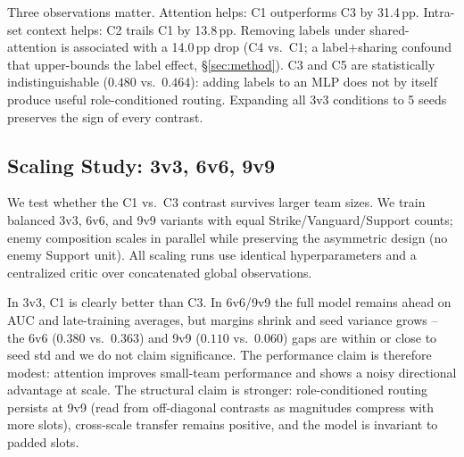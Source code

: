 \documentclass{nextgame2026}
\begin{document}
Three observations matter. Attention helps: C1 outperforms C3 by 31.4\,pp. Intra-set context helps: C2 trails C1 by 13.8\,pp. Removing labels under shared-attention is associated with a 14.0\,pp drop (C4 vs.\ C1; a label$+$sharing confound that upper-bounds the label effect, \S\ref{sec:method}). C3 and C5 are statistically indistinguishable ($0.480$ vs.\ $0.464$): adding labels to an MLP does not by itself produce useful role-conditioned routing. Expanding all 3v3 conditions to 5 seeds preserves the sign of every contrast.

\subsection{Scaling Study: 3v3, 6v6, 9v9}
\label{sec:scaling}

We test whether the C1 vs.\ C3 contrast survives larger team sizes. We train balanced 3v3, 6v6, and 9v9 variants with equal Strike/Vanguard/Support counts; enemy composition scales in parallel while preserving the asymmetric design (no enemy Support unit). All scaling runs use identical hyperparameters and a centralized critic over concatenated global observations.

\begin{table}[t]
\centering
\small
\setlength{\tabcolsep}{7pt}
\caption{Scaling results (mean$\pm$std). 3v3 and 9v9 now use 5 seeds for both C1 and C3; 6v6 remains 3 seeds.}
\end{table}

In 3v3, C1 is clearly better than C3. In 6v6/9v9 the full model remains ahead on AUC and late-training averages, but margins shrink and seed variance grows -- the 6v6 ($0.380$ vs.\ $0.363$) and 9v9 ($0.110$ vs.\ $0.060$) gaps are within or close to seed std and we do not claim significance. The performance claim is therefore modest: attention improves small-team performance and shows a noisy directional advantage at scale. The structural claim is stronger: role-conditioned routing persists at 9v9 (read from off-diagonal contrasts as magnitudes compress with more slots), cross-scale transfer remains positive, and the model is invariant to padded slots.
\end{document}
